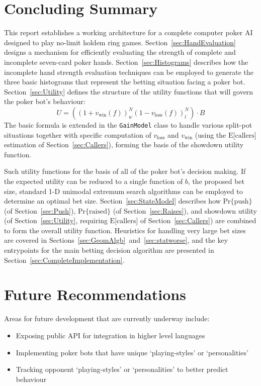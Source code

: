 


\chapter{Concluding Summary}
\label{sec:Summary}

This report establishes a working architecture for a complete computer poker AI designed to play no-limit holdem ring games.
Section~\ref{sec:HandEvaluation} designs a mechanism for efficiently evaluating the strength of complete and incomplete seven-card poker hands.
Section~\ref{sec:Histograms} describes how the incomplete hand strength evaluation techniques can be employed to generate the three basic histograms that represent the betting situation facing a poker bot.
Section~\ref{sec:Utility} defines the structure of the utility functions that will govern the poker bot's behaviour:
\[
U = \left( \left( 1 + v_{\mathrm{win}} \left( f \right) \right)^N_w \left( 1 - v_{\mathrm{loss}} \left( f \right) \right)^N_l \right) \cdot B
\]
The basic formula is extended in the \texttt{GainModel} class to handle various split-pot situations together with specific computation of $v_{\mathrm{loss}}$ and $v_{\mathrm{win}}$ (using the $\mathrm{E[callers}]$ estimation of Section~\ref{sec:Callers}), forming the basis of the showdown utility function.

Such utility functions for the basis of all of the poker bot's decision making.
If the expected utility can be reduced to a single function of $b$, the proposed bet size, standard 1-D unimodal extremum search algorithms can be employed to determine an optimal bet size.
Section~\ref{sec:StateModel} describes how $\mathrm{Pr\{push}\}$ (of Section~\ref{sec:Push}), $\mathrm{Pr\{raised}\}$ (of Section~\ref{sec:Raises}), and showdown utility (of Section~\ref{sec:Utility}, requiring $\mathrm{E[callers}]$ of Section~\ref{sec:Callers}) are combined to form the overall utility function.
Heuristics for handling very large bet sizes are covered in Sections~\ref{sec:GeomAlgb}~and~\ref{sec:statworse}, and the key entrypoints for the main betting decision algorithm are presented in Section~\ref{sec:CompleteImplementation}.



\chapter{Future Recommendations}
\label{sec:FutureDirection}

Areas for future development that are currently underway include:
\begin{itemize}
\singlespace
\item Exposing public API for integration in higher level languages
\item Implementing poker bots that have unique `playing-styles' or `personalities'
\item Tracking opponent `playing-styles' or `personalities' to better predict behaviour
\end{itemize}


